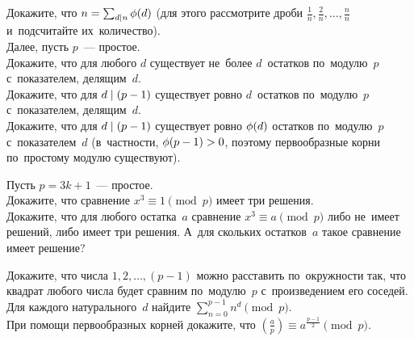 \begin{problems}

\item
\subproblem
Докажите, что
\(
    n = \sum_{d \mathrel{\vert} n} \mathrm{\phi}(d)
\)
(для этого рассмотрите дроби $\frac{1}{n}, \frac{2}{n}, \ldots, \frac{n}{n}$
и~подсчитайте их~количество).
\\
Далее, пусть $p$~--- простое.
\\
\subproblem
Докажите, что для любого $d$ существует не~более $d$~остатков по~модулю~$p$
с~показателем, делящим~$d$.
\\
\subproblem
Докажите, что для $d \mathrel{\vert} (p - 1)$ существует ровно $d$~остатков по~модулю~$p$
с~показателем, делящим~$d$.
\\
\subproblem
Докажите, что для $d \mathrel{\vert} (p - 1)$ существует ровно $\mathrm{\phi}(d)$ остатков
по~модулю~$p$ с~показателем~$d$
(в~частности, $\mathrm{\phi}(p - 1) > 0$, поэтому первообразные корни
по~простому модулю существуют).

\item
Пусть $p = 3 k + 1$~--- простое.
\\
\subproblem
Докажите, что сравнение $x^3 \equiv 1 \pmod p$ имеет три решения.
\\
\subproblem
Докажите, что для любого остатка~$a$ сравнение $x^3 \equiv a \pmod p$ либо
не~имеет решений, либо имеет три решения.
А~для скольких остатков~$a$ такое сравнение имеет решение?

\item
\subproblem
Докажите, что числа $1, 2, \ldots, (p - 1)$ можно расставить по~окружности так,
что квадрат любого числа будет сравним по~модулю~$p$ с~произведением его
соседей.
\\
\subproblem
Для каждого натурального~$d$ найдите
\(
    \sum_{n=0}^{p-1} n^d \pmod p
\).
\\
\subproblem
При помощи первообразных корней докажите, что
\(
    \genfrac{(}{)}{}{}{a}{p}
\equiv
    a^{\frac{p-1}{2}}
\pmod p
\).


\end{problems}
